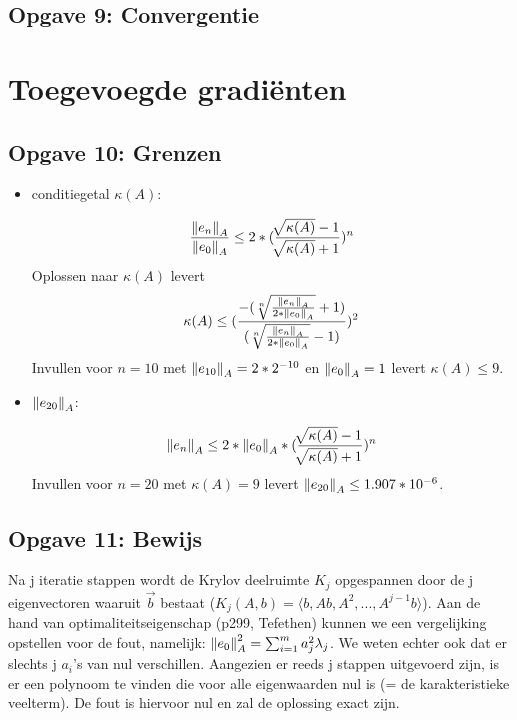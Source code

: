 \documentclass[a4paper]{article}
\newcommand{\opgave}[1]{\subsection{Opgave #1}}
\begin{document}
\opgave{9: Convergentie}\label{sec:oef9}

\section{Toegevoegde gradi\"enten}\label{sec:CG}

\opgave{10: Grenzen}\label{sec:oef10}

\begin{itemize}
    	\item conditiegetal \(\kappa(A)\): \par\noindent
        \[\frac{\norm{e_n}_A}{\norm{e_0}_A} \leq 2*(\frac{\sqrt[]{\kappa(A)}-1}{\sqrt[]					{\kappa(A)}+1})^n\]
        Oplossen naar \(\kappa(A)\) levert
        \[\kappa(A) \leq (\frac{-(\sqrt[n]{\frac{\norm{e_n}_A}{2*\norm{e_0}_A}}+1)}						{(\sqrt[n]{\frac{\norm{e_n}_A}{2*\norm{e_0}_A}}-1)})^2\]
        Invullen voor \(n = 10\) met \(\norm{e_{10}}_A = 2*2^{-10}\) en \(\norm{e_0}_A = 1\) 			levert \(\kappa(A) \leq 9\).
        
        \item \(\norm{e_{20}}_A\): \par\noindent
        \[\norm{e_n}_A \leq 2*\norm{e_0}_A*(\frac{\sqrt[]{\kappa(A)}-1}{\sqrt[]							{\kappa(A)}+1})^n\]
        Invullen voor \(n = 20\) met \(\kappa(A) = 9\) levert \(\norm{e_{20}}_A \leq 					1.907*10^{-6}\).
	\end{itemize}

\opgave{11: Bewijs}\label{sec:oef11}
Na j iteratie stappen wordt de Krylov deelruimte $K_j$ opgespannen door de j eigenvectoren waaruit $\vec{b}$ bestaat ($K_j(A,b) = \langle b, Ab, A^2,... ,A^{j-1}b \rangle $). Aan de hand van optimaliteitseigenschap (p299, Tefethen) kunnen we een vergelijking opstellen voor de fout, namelijk: $\norm{e_0}_A^2 = \sum_{i=1}^m a_j^2 \lambda_j$. We weten echter ook dat er slechts j $a_i$'s van nul verschillen. Aangezien er reeds j stappen uitgevoerd zijn, is er een polynoom te vinden die voor alle eigenwaarden nul is (= de karakteristieke veelterm). De fout is hiervoor nul en zal de oplossing exact zijn.
\end{document}
